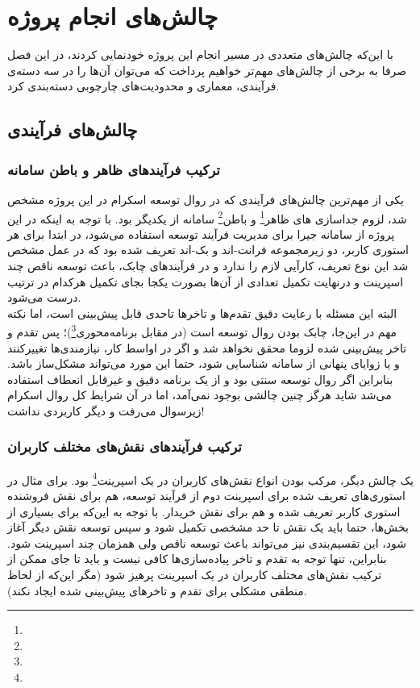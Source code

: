 \chapter{چالش‌های انجام پروژه}

با این‌که چالش‌های متعددی در مسیر انجام این پروژه خودنمایی کردند، در این فصل صرفا به برخی از چالش‌های مهم‌تر خواهیم پرداخت که می‌توان آن‌ها را در سه دسته‌ی فرآیندی، معماری و محدودیت‌های چارچوبی دسته‌بندی کرد.

\section{چالش‌های فرآیندی}

\subsection{ترکیب فرآیندهای ظاهر و باطن سامانه}

یکی از مهم‌ترین چالش‌های فرآیندی که در روال توسعه اسکرام در این پروژه مشخص شد، لزوم جداسازی های ظاهر\footnote{} و باطن\footnote{} سامانه از یکدیگر بود. با توجه به اینکه در این پروژه از سامانه جیرا برای مدیریت فرآیند توسعه استفاده می‌شود، در ابتدا برای هر استوری کاربر، دو زیرمجموعه فرانت-اند و بک-اند تعریف شده بود که در عمل مشخص شد این نوع تعریف، کارآیی لازم را ندارد و در فرآیندهای چابک، باعث توسعه ناقص چند اسپرینت و درنهایت تکمیل تعدادی از آن‌ها بصورت یکجا بجای تکمیل هرکدام در ترتیب درست می‌شود.\\

البته این مسئله با رعایت دقیق تقدم‌ها و تاخرها تاحدی قابل پیش‌بینی است، اما نکته مهم در این‌جا، چابک بودن روال توسعه است (در مقابل برنامه‌محوری\footnote{})؛ پس تقدم و تاخر پیش‌بینی شده لزوما محقق نخواهد شد و اگر در اواسط کار، نیازمندی‌ها تغییرکنند و یا زوایای پنهانی از سامانه شناسایی شود، حتما این مورد می‌تواند مشکل‌ساز باشد. بنابراین اگر روال توسعه سنتی بود و از یک برنامه دقیق و غیرقابل انعطاف استفاده می‌شد شاید هرگز چنین چالشی بوجود نمی‌آمد، اما در آن شرایط کل روال اسکرام زیرسوال می‌رفت و دیگر کاربردی نداشت!\\

\newpage

\subsection{ترکیب فرآیندهای نقش‌های مختلف کاربران}

یک چالش دیگر، مرکب بودن انواع نقش‌های کاربران در یک اسپرینت\footnote{} بود. برای مثال در استوری‌های تعریف شده برای اسپرینت دوم از فرآیند توسعه، هم برای نقش فروشنده استوری کاربر تعریف شده و هم برای نقش خریدار. با توجه به این‌که برای بسیاری از بخش‌ها، حتما باید یک نقش تا حد مشخصی تکمیل شود و سپس توسعه نقش دیگر آغاز شود، این تقسیم‌بندی نیز می‌تواند باعث توسعه ناقص ولی همزمان چند اسپرینت شود. بنابراین، تنها توجه به تقدم و تاخر پیاده‌سازی‌ها کافی نیست و باید تا جای ممکن از ترکیب نقش‌های مختلف کاربران در یک اسپرینت پرهیز شود (مگر این‌که از لحاظ منطقی مشکلی برای تقدم و تاخرهای پیش‌بینی شده ایجاد نکند).\\

